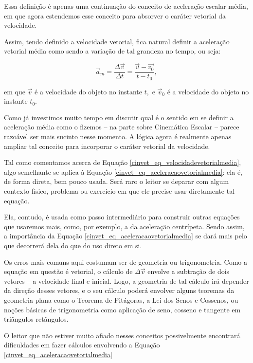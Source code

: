 
Essa definição é apenas uma continuação do conceito de aceleração escalar média, em que agora estendemos esse conceito para absorver o caráter vetorial da velocidade.

Assim, tendo definido a velocidade vetorial, fica natural definir a aceleração vetorial média como sendo a variação de tal grandeza no tempo, ou seja:

$$ \vec{a}_m = \dfrac{\Delta \vec{v}}{\Delta t} = \dfrac{\vec{v}-\vec{v_0}}{t-t_0},$$

\noindent em que $\vec{v}$ é a velocidade do objeto no instante $t,$ e $\vec{v}_0$ é a velocidade do objeto no instante $t_0.$

Como já investimos muito tempo em discutir qual é o sentido em se definir a aceleração média como o fizemos -- na parte sobre Cinemática Escalar -- parece razoável ser mais sucinto nesse momento. A lógica agora é realmente apenas ampliar tal conceito para incorporar o caráter vetorial da velocidade.



Tal como comentamos acerca de Equação \eqref{cinvet_eq_velocidadevetorialmedia}, algo semelhante se aplica à Equação \eqref{cinvet_eq_aceleracaovetorialmedia}: ela é, de forma direta, bem pouco usada. Será raro o leitor se deparar com algum contexto físico, problema ou exercício em que ele precise usar diretamente tal equação.

Ela, contudo, é usada como passo intermediário para construir outras equações que usaremos mais, como, por exemplo, a da aceleração centrípeta. Sendo assim, a importância da Equação \eqref{cinvet_eq_aceleracaovetorialmedia} se dará mais pelo que decorrerá dela do que do uso direto em si.



Os erros mais comuns aqui costumam ser de geometria ou trigonometria. Como a equação em questão é vetorial, o cálculo de $\Delta \vec{v}$ envolve a subtração de dois vetores -- a velocidade final e inicial. Logo, a geometria de tal cálculo irá depender da direção desses vetores, e o seu cálculo poderá envolver alguns teoremas da geometria plana como o Teorema de Pitágoras, a Lei dos Senos e Cossenos, ou noções básicas de trigonometria como aplicação de seno, cosseno e tangente em triângulos retângulos.

O leitor que não estiver muito afiado nesses conceitos possivelmente encontrará dificuldades em fazer cálculos envolvendo a Equação \eqref{cinvet_eq_aceleracaovetorialmedia}



